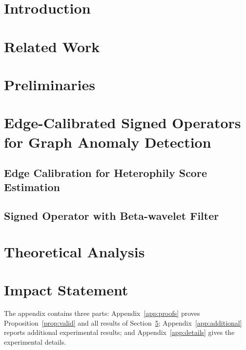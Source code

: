 \documentclass{article}
\theoremstyle{plain}
\theoremstyle{definition}
\theoremstyle{remark}
\begin{document}
\section{Introduction}\label{sec:intro}


\section{Related Work}\label{sec:related}


\section{Preliminaries}\label{sec:prelim}


\section{Edge-Calibrated Signed Operators for Graph Anomaly Detection}\label{sec:method}

\subsection{Edge Calibration for Heterophily Score Estimation}\label{sec:calibration}


\subsection{Signed Operator with Beta-wavelet Filter}\label{sec:operator}



\section{Theoretical Analysis}\label{sec:theory}






\FloatBarrier

\section*{Impact Statement}




\newpage
\appendix
\onecolumn

The appendix contains three parts: Appendix~\ref{app:proofs} proves Proposition~\ref{prop:valid} and all results of Section~\ref{sec:theory}; Appendix~\ref{app:additional} reports additional experimental results; and Appendix~\ref{app:details} gives the experimental details.




\end{document}
